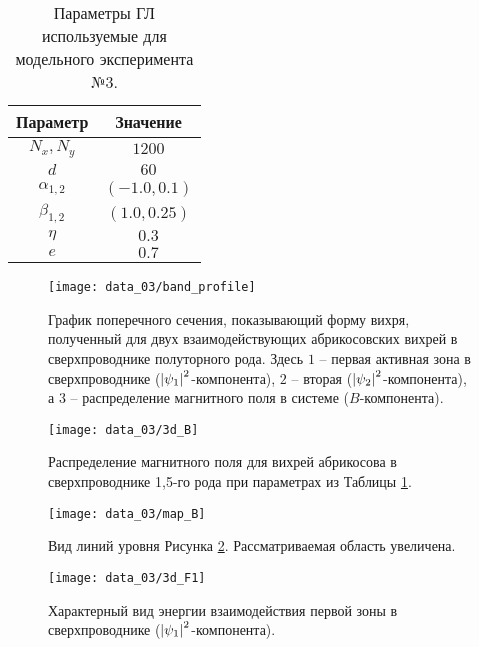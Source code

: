 \begin{table}[h!]
    \centering
    \begin{tabular}{|c|c|}
        \hline 
        Параметр           & Значение              \\ \hline
        \( N_x, N_y \)     & \( 1200 \)            \\ \hline
        \( d \)            & \( 60 \)              \\ \hline
        \( \alpha_{1,2} \) & \( (-1.0, 0.1) \)     \\ \hline
        \( \beta_{1,2} \)  & \( (1.0, 0.25) \)     \\ \hline
        \( \eta \)         & \( 0.3 \)             \\ \hline
        \( e \)            & \( 0.7 \)             \\ \hline
    \end{tabular}
    \caption{Параметры ГЛ используемые для модельного эксперимента №3.}
    \label{param:03}
\end{table}

\begin{figure}[h!]
    \center
    \texttt{[image: data\_03/band\_profile]}
    \caption{График поперечного сечения, показывающий форму вихря, полученный 
        для двух взаимодействующих абрикосовских вихрей в сверхпроводнике 
        полуторного рода. Здесь \( 1 \) -- первая активная зона в 
        сверхпроводнике (\( \left| \psi_1 \right|^2 \)-компонента), \( 2 \) -- вторая 
        (\( \left| \psi_2 \right|^2 \)-компонента), а \( 3 \) -- распределение 
        магнитного поля в системе (\( B \)-компонента).}
    \label{img:band-profile-03}
\end{figure}

\begin{figure}[h!]
    \center
    \texttt{[image: data\_03/3d\_B]}
    \caption{Распределение магнитного поля для вихрей абрикосова в 
        сверхпроводнике 1,5-го рода при параметрах из Таблицы \ref{param:03}.}
    \label{img:3d-field-B-03}
\end{figure}

\begin{figure}[h!]
    \center
    \texttt{[image: data\_03/map\_B]}
    \caption{Вид линий уровня Рисунка \ref{img:3d-field-B-03}. 
        Рассматриваемая область увеличена.}
    \label{img:map-field-B-03}
\end{figure}

\begin{figure}[h!]
    \center
    \texttt{[image: data\_03/3d\_F1]}
    \caption{Характерный вид энергии взаимодействия первой зоны в 
        сверхпроводнике (\( \left| \psi_1 \right|^2 \)-компонента).}
    \label{img:3d-band-1-03}
\end{figure}

